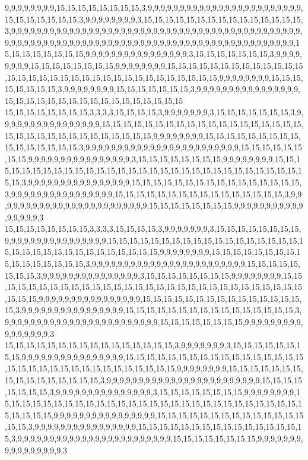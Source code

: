 9,9,9,9,9,9,9,9,15,15,15,15,15,15,15,15,3,9,9,9,9,9,9,9,9,9,9,9,9,9,9,9,9,9,9,9,9,9,9,9,9,15,15,15,15,15,15,15,3,9,9,9,9,9,9,9,9,3,15,15,15,15,15,15,15,15,15,15,15,15,15,15,15,3,9,9,9,9,9,9,9,9,9,9,9,9,9,9,9,9,9,9,9,9,9,9,9,9,9,9,9,9,9,9,9,9,9,9,9,9,9,9,9,9,9,9,9,9,9,9,9,9,9,9,9,9,9,9,9,9,9,9,9,9,9,9,9,9,9,9,9,9,9,9,9,9,9,9,9,9,9,9,9,9,9,9,9,9,9,9,9,9,9,9,15,15,15,15,15,15,15,15,9,9,9,9,9,9,9,9,9,9,9,9,9,9,9,9,3,15,15,15,15,15,15,15,3,9,9,9,9,9,9,9,9,15,15,15,15,15,15,15,15,9,9,9,9,9,9,9,9,15,15,15,15,15,15,15,15,15,15,15,15,15,15,15,15,15,15,15,15,15,15,15,15,15,15,15,15,15,15,15,15,15,9,9,9,9,9,9,9,9,15,15,15,15,15,15,15,15,3,9,9,9,9,9,9,9,9,15,15,15,15,15,15,15,3,9,9,9,9,9,9,9,9,9,9,9,9,9,9,9,9,15,15,15,15,15,15,15,15,15,15,15,15,15,15,15,15,15
15,15,15,15,15,15,15,15,3,3,3,3,15,15,15,15,3,9,9,9,9,9,9,9,3,15,15,15,15,15,15,15,3,9,9,9,9,9,9,9,9,9,9,9,9,9,9,9,9,15,15,15,15,15,15,15,15,15,15,15,15,15,15,15,15,15,15,15,15,15,15,15,15,15,15,15,15,15,15,15,15,15,9,9,9,9,9,9,9,9,15,15,15,15,15,15,15,15,15,15,15,15,15,15,15,15,3,9,9,9,9,9,9,9,9,9,9,9,9,9,9,9,9,9,9,9,9,9,9,9,9,15,15,15,15,15,15,15,15,9,9,9,9,9,9,9,9,9,9,9,9,9,9,9,9,3,15,15,15,15,15,15,15,15,9,9,9,9,9,9,9,9,15,15,15,15,15,15,15,15,15,15,15,15,15,15,15,15,15,15,15,15,15,15,15,15,15,15,15,15,15,15,15,15,3,9,9,9,9,9,9,9,9,9,9,9,9,9,9,9,9,15,15,15,15,15,15,15,15,15,15,15,15,15,15,15,15,3,9,9,9,9,9,9,9,9,9,9,9,9,9,9,9,9,15,15,15,15,15,15,15,15,15,15,15,15,15,15,15,15,3,9,9,9,9,9,9,9,9,9,9,9,9,9,9,9,9,9,9,9,9,9,9,9,9,15,15,15,15,15,15,15,15,9,9,9,9,9,9,9,9,9,9,9,9,9,9,9,9,3
15,15,15,15,15,15,15,15,3,3,3,3,15,15,15,15,3,9,9,9,9,9,9,9,3,15,15,15,15,15,15,15,15,9,9,9,9,9,9,9,9,9,9,9,9,9,9,9,9,15,15,15,15,15,15,15,15,15,15,15,15,15,15,15,15,15,15,15,15,15,15,15,15,15,15,15,15,15,15,15,15,15,9,9,9,9,9,9,9,9,15,15,15,15,15,15,15,15,15,15,15,15,15,15,15,15,3,9,9,9,9,9,9,9,9,9,9,9,9,9,9,9,9,9,9,9,9,9,9,9,9,15,15,15,15,15,15,15,15,3,9,9,9,9,9,9,9,9,9,9,9,9,9,9,9,3,15,15,15,15,15,15,15,15,9,9,9,9,9,9,9,9,15,15,15,15,15,15,15,15,15,15,15,15,15,15,15,15,15,15,15,15,15,15,15,15,15,15,15,15,15,15,15,15,15,9,9,9,9,9,9,9,9,9,9,9,9,9,9,9,9,15,15,15,15,15,15,15,15,15,15,15,15,15,15,15,15,3,9,9,9,9,9,9,9,9,9,9,9,9,9,9,9,9,15,15,15,15,15,15,15,15,15,15,15,15,15,15,15,15,3,9,9,9,9,9,9,9,9,9,9,9,9,9,9,9,9,9,9,9,9,9,9,9,9,15,15,15,15,15,15,15,15,9,9,9,9,9,9,9,9,9,9,9,9,9,9,9,9,3
15,15,15,15,15,15,15,15,15,15,15,15,15,15,15,15,3,9,9,9,9,9,9,9,3,15,15,15,15,15,15,15,15,9,9,9,9,9,9,9,9,9,9,9,9,9,9,9,9,15,15,15,15,15,15,15,15,15,15,15,15,15,15,15,15,15,15,15,15,15,15,15,15,15,15,15,15,15,15,15,15,15,9,9,9,9,9,9,9,9,15,15,15,15,15,15,15,15,15,15,15,15,15,15,15,15,3,9,9,9,9,9,9,9,9,9,9,9,9,9,9,9,9,9,9,9,9,9,9,9,9,15,15,15,15,15,15,15,15,3,9,9,9,9,9,9,9,9,9,9,9,9,9,9,9,3,15,15,15,15,15,15,15,15,9,9,9,9,9,9,9,9,15,15,15,15,15,15,15,15,15,15,15,15,15,15,15,15,15,15,15,15,15,15,15,15,15,15,15,15,15,15,15,15,15,9,9,9,9,9,9,9,9,9,9,9,9,9,9,9,9,15,15,15,15,15,15,15,15,15,15,15,15,15,15,15,15,3,9,9,9,9,9,9,9,9,9,9,9,9,9,9,9,9,15,15,15,15,15,15,15,15,15,15,15,15,15,15,15,15,3,9,9,9,9,9,9,9,9,9,9,9,9,9,9,9,9,9,9,9,9,9,9,9,9,15,15,15,15,15,15,15,15,9,9,9,9,9,9,9,9,9,9,9,9,9,9,9,9,3
